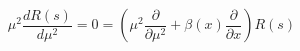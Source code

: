 \begin{equation}%
\mu^2 \frac{d R(s)}{d\mu^2} = 0 = \left( \mu^2 \frac{\partial}{\partial
\mu^2} + \beta (x) \frac{\partial}{\partial x} \right) R(s)
\end{equation}

